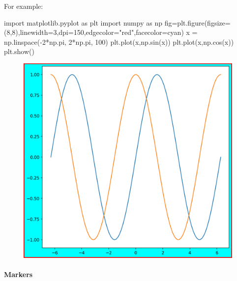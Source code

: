 \documentclass[11pt]{article}
\newenvironment{Shaded}{}{}
\newcommand{\DecValTok}[1]{\textcolor[rgb]{0.25,0.63,0.44}{{#1}}}
\newcommand{\StringTok}[1]{\textcolor[rgb]{0.25,0.44,0.63}{{#1}}}
\newcommand{\NormalTok}[1]{{#1}}
\newcommand{\ImportTok}[1]{{#1}}
\newcommand{\OperatorTok}[1]{\textcolor[rgb]{0.40,0.40,0.40}{{#1}}}
\begin{document}
For example:

\begin{Shaded}
\begin{Highlighting}[]
\ImportTok{import}\NormalTok{ matplotlib.pyplot }\ImportTok{as}\NormalTok{ plt}
\ImportTok{import}\NormalTok{ numpy }\ImportTok{as}\NormalTok{ np}
\NormalTok{fig}\OperatorTok{=}\NormalTok{plt.figure(figsize}\OperatorTok{=}\NormalTok{(}\DecValTok{8}\NormalTok{,}\DecValTok{8}\NormalTok{),linewidth}\OperatorTok{=}\DecValTok{3}\NormalTok{,dpi}\OperatorTok{=}\DecValTok{150}\NormalTok{,edgecolor}\OperatorTok{=}\StringTok{"red"}\NormalTok{,facecolor}\OperatorTok{=}\StringTok{\textquotesingle{}cyan\textquotesingle{}}\NormalTok{)}
\NormalTok{x }\OperatorTok{=}\NormalTok{ np.linspace(}\OperatorTok{{-}}\DecValTok{2}\OperatorTok{*}\NormalTok{np.pi, }\DecValTok{2}\OperatorTok{*}\NormalTok{np.pi, }\DecValTok{100}\NormalTok{)}
\NormalTok{plt.plot(x,np.sin(x))}
\NormalTok{plt.plot(x,np.cos(x))}
\NormalTok{plt.show()}
\end{Highlighting}
\end{Shaded}

\begin{figure}
\centering
\includegraphics[scale=0.6]{fig_costum.png}
\end{figure}

\hypertarget{markers}{%
\paragraph{Markers}\label{markers}}
\end{document}
